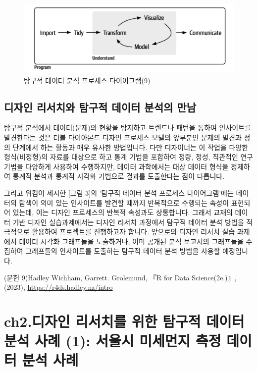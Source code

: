 \documentclass[
  letterpaper,
]{book}
\begin{document}
\begin{figure}[H]

{\centering \includegraphics{img/fig3.png}

}

\caption{탐구적 데이터 분석 프로세스 다이어그램(9)}

\end{figure}%

\section{디자인 리서치와 탐구적 데이터 분석의
만남}\label{uxb514uxc790uxc778-uxb9acuxc11cuxce58uxc640-uxd0d0uxad6cuxc801-uxb370uxc774uxd130-uxbd84uxc11duxc758-uxb9ccuxb0a8}

탐구적 분석에서 데이터(문제)의 현황을 탐지하고 트렌드나 패턴을 통하여
인사이트를 발견한다는 것은 더블 다이아몬드 디자인 프로세스 모델의
앞부분인 문제의 발견과 정의 단계에서 하는 활동과 매우 유사한 방법입니다.
다만 디자이너는 이 작업을 다양한 형식(비정형)의 자료를 대상으로 하고
통계 기법을 포함하여 정량, 정성, 직관적인 연구 기법을 다양하게 사용하여
수행하지만, 데이터 과학에서는 대상 데이터 형식을 정제하여 통계적 분석과
통계적 시각화 기법으로 결과를 도출한다는 점이 다릅니다.

그리고 위컴이 제시한 {[}그림 3{]}의 '탐구적 데이터 분석 프로세스
다이어그램'에는 데이터의 탐색이 의미 있는 인사이트를 발견할 때까지
반복적으로 수행되는 속성이 표현되어 있는데, 이는 디자인 프로세스의
반복적 속성과도 상통합니다. 그래서 교재의 데이터 기반 디자인
실습과제에서는 디자인 리서치 과정에서 탐구적 데이터 분석 방법을
적극적으로 활용하여 프로젝트를 진행하고자 합니다. 앞으로의 디자인 리서치
실습 과제에서 데이터 시각화 그래프들을 도출하거나, 이미 공개된 분석
보고서의 그래프들을 수집하여 그래프들의 인사이트를 도출하는 탐구적
데이터 분석 방법을 사용할 예정입니다.

(문헌 9)Hadley Wichham, Garrett. Grolemund, 『R for Data Science(2e.)』,
(2023), \url{https://r4ds.hadley.nz/intro}

\chapter{ch2.디자인 리서치를 위한 탐구적 데이터 분석 사례 (1): 서울시
미세먼지 측정 데이터 분석
사례}\label{ch2.uxb514uxc790uxc778-uxb9acuxc11cuxce58uxb97c-uxc704uxd55c-uxd0d0uxad6cuxc801-uxb370uxc774uxd130-uxbd84uxc11d-uxc0acuxb840-1-uxc11cuxc6b8uxc2dc-uxbbf8uxc138uxba3cuxc9c0-uxce21uxc815-uxb370uxc774uxd130-uxbd84uxc11d-uxc0acuxb840}
\end{document}
